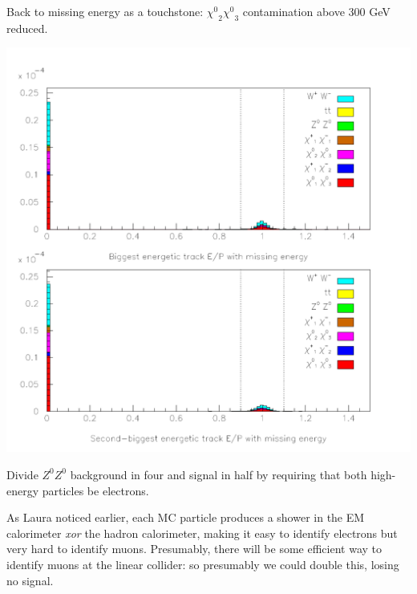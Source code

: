 \documentclass[landscape]{article}
\begin{document}
Back to missing energy as a touchstone: $\mbox{$\chi^0$}_2
\mbox{$\chi^0$}_3$ contamination above 300 GeV reduced.

\pagebreak

\begin{center} \includegraphics[height=0.8\textheight]{withmatching_4.pdf} \end{center}

Divide $Z^0Z^0$ background in four and signal in half by requiring
that both high-energy particles be electrons.

\vspace{0.2 cm}
As Laura noticed earlier, each MC particle produces a shower in the EM
calorimeter {\it xor} the hadron calorimeter, making it easy to
identify electrons but very hard to identify muons.  Presumably, there
will be some efficient way to identify muons at the linear collider:
so presumably we could double this, losing no signal.

\pagebreak
\end{document}
